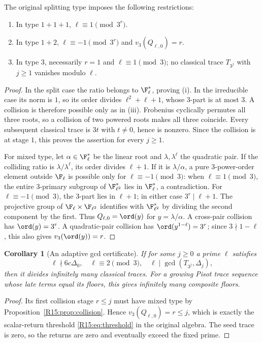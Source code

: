 \documentclass[11pt,a4paper]{article}
\newtheorem{corollary}[theorem]{Corollary}\newtheorem{mainthm}[theorem]{Theorem}
\theoremstyle{definition}\newtheorem{definition}[theorem]{Definition}
\theoremstyle{remark}\newtheorem{remark}[theorem]{Remark}
\begin{document}
\begin{proposition}\label{R15:prop:collision}
The original splitting type imposes the following restrictions:
\begin{enumerate}[label=\textup{(\roman*)}]
\item In type $1+1+1$, $\ell\equiv1\pmod{3^r}$.
\item In type $1+2$, $\ell\equiv-1\pmod{3^r}$ and
      $v_3(Q_{\ell,0})=r$.
\item In type $3$, necessarily $r=1$ and $\ell\equiv1\pmod3$;
      no classical trace $T_{3^j}$ with $j\ge1$ vanishes modulo $\ell$.
\end{enumerate}
\end{proposition}
\begin{proof}
In the split case the ratio belongs to $\F_\ell^*$, proving (i).
In the irreducible case its norm is $1$, so its order divides
$\ell^2+\ell+1$, whose $3$-part is at most $3$. A collision is
therefore possible only as in (iii). Frobenius cyclically permutes
all three roots, so a collision of two powered roots makes all
three coincide. Every subsequent classical trace is $3t$ with
$t\ne0$, hence is nonzero. Since the collision is at stage $1$,
this proves the assertion for every $j\ge1$.

For mixed type, let $\alpha\in\F_\ell^*$ be the linear root
and $\lambda,\lambda^\ell$ the quadratic pair. If the colliding
ratio is $\lambda/\lambda^\ell$, its order divides $\ell+1$.
If it is $\lambda/\alpha$, a pure $3$-power-order element outside
$\F_\ell$ is possible only for $\ell\equiv-1\pmod3$:
when $\ell\equiv1\pmod3$, the entire $3$-primary subgroup of
$\F_{\ell^2}^*$ lies in $\F_\ell^*$, a contradiction.
For $\ell\equiv-1\pmod3$, the $3$-part lies in $\ell+1$;
in either case $3^r\mid\ell+1$.
The projective group of $\F_\ell\times\F_{\ell^2}$ identifies
with $\F_{\ell^2}^*$ by dividing the second component by the
first. Thus $Q_{\ell,0}=\ord(y)$ for $y=\lambda/\alpha$.
A cross-pair collision has $\ord(y)=3^r$. A quadratic-pair
collision has $\ord(y^{1-\ell})=3^r$; since
$3\nmid1-\ell$, this also gives $v_3(\ord(y))=r$.
\end{proof}

\begin{corollary}[An adaptive gcd certificate]\label{R15:cor:gcdcert}
If for some $j\ge0$ a prime $\ell$ satisfies
\[
 \ell\nmid6c\Delta_0,\quad \ell\equiv2\pmod3,\quad
 \ell\mid\gcd(T_{3^j},\Delta_j),
\]
then it divides infinitely many classical traces. For a growing
Pisot trace sequence whose late terms equal its floors, this gives
infinitely many composite floors.
\end{corollary}
\begin{proof}
Its first collision stage $r\le j$ must have mixed type by
Proposition~\ref{R15:prop:collision}. Hence $v_3(Q_{\ell,0})=r\le j$,
which is exactly the scalar-return threshold \eqref{R15:eq:threshold}
in the original algebra. The seed trace is zero, so the returns
are zero and eventually exceed the fixed prime.
\end{proof}
\end{document}
